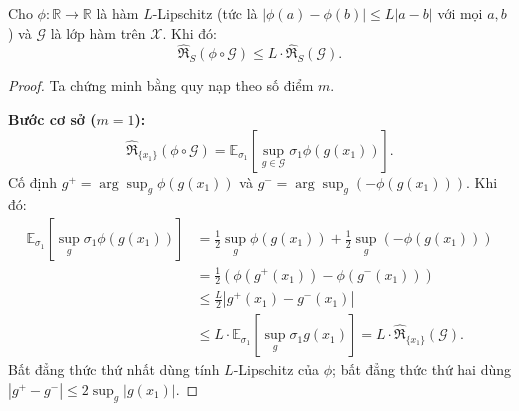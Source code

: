 \begin{morong}
\begin{lemma}
\label{lem:talagrand}
Cho $\phi: \mathbb{R} \to \mathbb{R}$ là hàm $L$-Lipschitz 
(tức là $|\phi(a) - \phi(b)| \leq L|a-b|$ với mọi $a,b$) 
và $\mathcal{G}$ là lớp hàm trên $\mathcal{X}$. Khi đó:
\[
  \hat{\mathfrak{R}}_S(\phi \circ \mathcal{G}) 
  \leq L \cdot \hat{\mathfrak{R}}_S(\mathcal{G}).
\]
\end{lemma}

\begin{proof}
Ta chứng minh bằng quy nạp theo số điểm $m$.

\textbf{Bước cơ sở ($m = 1$):}
\[
  \hat{\mathfrak{R}}_{\{x_1\}}(\phi \circ \mathcal{G})
  = \mathbb{E}_{\sigma_1}\left[\sup_{g \in \mathcal{G}} 
    \sigma_1 \phi(g(x_1))\right].
\]
Cố định $g^+ = \arg\sup_g \phi(g(x_1))$ và 
$g^- = \arg\sup_g (-\phi(g(x_1)))$. Khi đó:
\begin{align*}
  \mathbb{E}_{\sigma_1}\left[\sup_g \sigma_1\phi(g(x_1))\right]
  &= \frac{1}{2}\sup_g \phi(g(x_1)) 
   + \frac{1}{2}\sup_g (-\phi(g(x_1))) \\
  &= \frac{1}{2}(\phi(g^+(x_1)) - \phi(g^-(x_1))) \\
  &\leq \frac{L}{2}|g^+(x_1) - g^-(x_1)| \\
  &\leq L \cdot \mathbb{E}_{\sigma_1}
    \left[\sup_g \sigma_1 g(x_1)\right]
  = L \cdot \hat{\mathfrak{R}}_{\{x_1\}}(\mathcal{G}).
\end{align*}
Bất đẳng thức thứ nhất dùng tính $L$-Lipschitz của $\phi$; 
bất đẳng thức thứ hai dùng 
$|g^+ - g^-| \leq 2\sup_g |g(x_1)|$.


\end{proof}
\end{morong}

